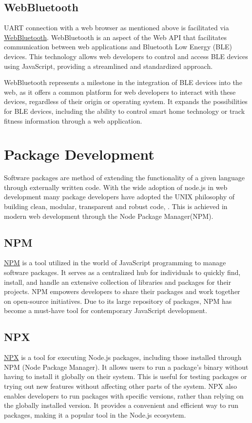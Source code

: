 \documentclass{l4proj}
\begin{document}
\subsection{WebBluetooth}
\text UART connection with a web browser as mentioned above is facilitated via \href{https://developer.mozilla.org/en-US/docs/Web/API/Web_Bluetooth_API}{WebBluetooth}. WebBluetooth is an aspect of the Web API that facilitates communication between web applications and Bluetooth Low Energy (BLE) devices. This technology allows web developers to control and access BLE devices using JavaScript, providing a streamlined and standardized approach.

WebBluetooth represents a milestone in the integration of BLE devices into the web, as it offers a common platform for web developers to interact with these devices, regardless of their origin or operating system. It expands the possibilities for BLE devices, including the ability to control smart home technology or track fitness information through a web application.

\section{Package Development}

Software packages are method of extending the functionality of a given language through externally written code. With the wide adoption of node.js in web development many package developers have adopted the UNIX philosophy of building clean, modular, transparent and robust code, \cite{TheArtOfUNIXProgramming}. This is achieved in modern web development through the Node Package Manager(NPM).

\subsection{NPM}
\href{https://www.npmjs.com/}{NPM} \text is a tool utilized in the world of JavaScript programming to manage software packages. It serves as a centralized hub for individuals to quickly find, install, and handle an extensive collection of libraries and packages for their projects. NPM empowers developers to share their packages and work together on open-source initiatives. Due to its large repository of packages, NPM has become a must-have tool for contemporary JavaScript development.

\subsection{NPX}
\href{https://docs.npmjs.com/cli/v7/commands/npx}{NPX} \text is a tool for executing Node.js packages, including those installed through NPM (Node Package Manager). It allows users to run a package's binary without having to install it globally on their system. This is useful for testing packages or trying out new features without affecting other parts of the system. NPX also enables developers to run packages with specific versions, rather than relying on the globally installed version. It provides a convenient and efficient way to run packages, making it a popular tool in the Node.js ecosystem.
\end{document}
